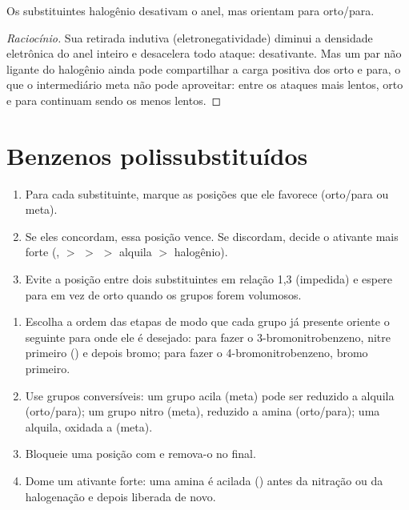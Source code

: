 \begin{proposition}[Os halogênios]\label{prop:b2:aromatic-substitution:halogens}
Os substituintes halogênio desativam o anel, mas orientam para orto/para.
\end{proposition}

\begin{proof}[Raciocínio]
Sua retirada indutiva (eletronegatividade) diminui a densidade eletrônica do
anel inteiro e desacelera todo ataque: desativante. Mas um par não ligante do
halogênio ainda pode compartilhar a carga positiva dos  orto e para, o que o intermediário meta não pode aproveitar: entre os
ataques mais lentos, orto e para continuam sendo os menos lentos.
\end{proof}

\section{Benzenos polissubstituídos}

\begin{method}\label{met:b2:aromatic-substitution:predict-position}
\begin{enumerate}
  \item Para cada substituinte, marque as posições que ele favorece (orto/para
        ou meta).
  \item Se eles concordam, essa posição vence. Se discordam, decide o ativante
        mais forte (,  $>$  $>$  $>$ alquila $>$ halogênio).
  \item Evite a posição entre dois substituintes em relação 1,3 (impedida) e
        espere para em vez de orto quando os grupos forem volumosos.
\end{enumerate}
\end{method}

\begin{method}\label{met:b2:aromatic-substitution:plan-aromatic}
\begin{enumerate}
  \item Escolha a ordem das etapas de modo que cada grupo já presente oriente o
        seguinte para onde ele é desejado: para fazer o 3-bromonitrobenzeno,
        nitre primeiro () e depois bromo; para fazer o
        4-bromonitrobenzeno, bromo primeiro.
  \item Use grupos conversíveis: um grupo acila (meta) pode ser reduzido a
        alquila (orto/para); um grupo nitro (meta), reduzido a amina
        (orto/para); uma alquila, oxidada a  (meta).
  \item Bloqueie uma posição com  e remova-o no final.
  \item Dome um ativante forte: uma amina é acilada () antes da
        nitração ou da halogenação e depois liberada de novo.
\end{enumerate}
\end{method}

